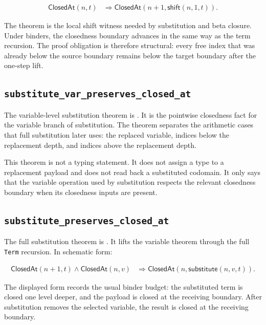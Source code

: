 $$
\begin{aligned}
  \mathsf{ClosedAt}(n,t)
  &\Rightarrow
  \mathsf{ClosedAt}(n+1,\mathsf{shift}(n,1,t)).
\end{aligned}
$$

The theorem is the local shift witness needed by substitution and beta
closure. Under binders, the closedness boundary advances in the same way as the
term recursion. The proof obligation is therefore structural: every free index
that was already below the source boundary remains below the target boundary
after the one-step lift.

\subsection{\texttt{substitute\_var\_preserves\_closed\_at}}
\label{subsec:metacic-closure-preservation-audit-map-substitute-var}

The variable-level substitution theorem is
.
It is the pointwise closedness fact for the variable branch of substitution.
The theorem separates the arithmetic cases that full substitution later uses:
the replaced variable, indices below the replacement depth, and indices above
the replacement depth.

This theorem is not a typing statement. It does not assign a type to a
replacement payload and does not read back a substituted codomain. It only says
that the variable operation used by substitution respects the relevant
closedness boundary when its closedness inputs are present.

\subsection{\texttt{substitute\_preserves\_closed\_at}}
\label{subsec:metacic-closure-preservation-audit-map-substitute}

The full substitution theorem is
.
It lifts the variable theorem through the full \texttt{Term} recursion. In
schematic form:

$$
\begin{aligned}
  \mathsf{ClosedAt}(n+1,t)
  \wedge
  \mathsf{ClosedAt}(n,v)
  &\Rightarrow
  \mathsf{ClosedAt}(n,\mathsf{substitute}(n,v,t)).
\end{aligned}
$$

The displayed form records the usual binder budget: the substituted term is
closed one level deeper, and the payload is closed at the receiving boundary.
After substitution removes the selected variable, the result is closed at the
receiving boundary.

